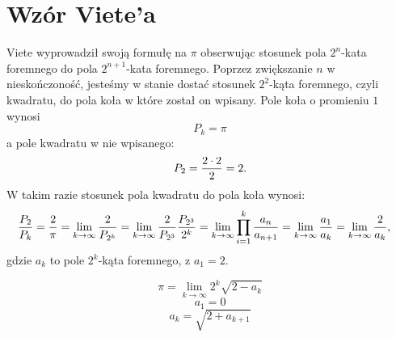 \section{Wzór Viete'a}


Viete wyprowadził swoją formułę na $\pi$ obserwując stosunek pola $2^n$-kata foremnego do pola $2^{n+1}$-kata foremnego. Poprzez zwiększanie $n$ w nieskończoność, jesteśmy w stanie dostać stosunek $2^2$-kąta foremnego, czyli kwadratu, do pola koła w które został on wpisany. Pole koła o promieniu $1$ wynosi
$$P_k=\pi$$
a pole kwadratu w nie wpisanego:
$$P_2={2\cdot 2\over 2}=2.$$
W takim razie stosunek pola kwadratu do pola koła wynosi:
\begin{align*}
    {P_2\over P_k}&={2\over\pi}=\lim_{k\to\infty}{2\over P_{2^k}}=\lim_{k\to\infty}{2\over P_{2^3}}{P_{2^3}\over 2^k}=\lim_{k\to\infty}\prod\limits_{i=1}^k{a_{n}\over a_{n+1}}=\lim_{k\to\infty}{a_1\over a_k}=\lim_{k\to\infty}{2\over a_k},
\end{align*}
gdzie  $a_k$ to pole $2^k$-kąta foremnego, z $a_1=2$.




$$\pi=\lim\limits_{k\to\infty}2^k\sqrt{2-a_k}$$
$$a_1=0$$
$$a_k=\sqrt{2+a_{k+1}}$$